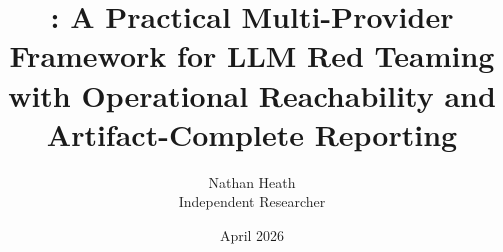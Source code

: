 \documentclass[11pt]{article}
\title{\system: A Practical Multi-Provider Framework for LLM Red Teaming\\
with Operational Reachability and Artifact-Complete Reporting}
\author{
  Nathan Heath \\
  Independent Researcher
}
\date{April 2026}
\begin{document}
\maketitle

\begin{abstract}

\end{abstract}


















\appendix

\end{document}
